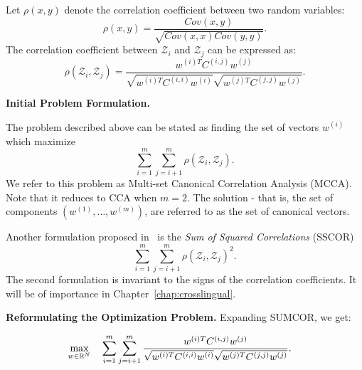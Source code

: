 Let $\rho\left(x,y\right)$ denote the correlation
 coefficient between two random variables:
\begin{equation*}
\rho\left(x,y\right) =
 \frac{Cov\left(x,y\right)}{\sqrt{Cov\left(x,x\right) Cov\left(y,y\right)}}.
\end{equation*}
 The correlation coefficient between $\mathcal{Z}_i$ and
 $\mathcal{Z}_j$ can be expressed as:
\begin{equation*}
\rho\left(\mathcal{Z}_i, \mathcal{Z}_j\right) = \frac{w^{(i)T} C^{(i,j)}
   w^{(j)}}{\sqrt{w^{(i)T} C^{(i,i)} w^{(i)}}\sqrt{w^{(j)T}
     C^{(j,j)} w^{(j)}} }.
\end{equation*}

\noindent\textbf{Initial Problem Formulation.}

The problem described above can be stated as
finding the set of vectors $w^{(i)}$
which maximize
\begin{equation}\label{eq:SUMCOR}
\tag{SUMCOR}
\sum_{i = 1}^m \sum_{j = i+1}^m
\rho\left(\mathcal{Z}_i, \mathcal{Z}_j\right).
\end{equation}
We refer to this problem as Multi-set Canonical
Correlation Analysis (MCCA). Note that it reduces to CCA when
$m=2$. The solution - that is, the set of components $\left(w^{(1)}, \ldots, w^{(m)}\right)$,
are referred to as the set of canonical vectors.

Another formulation proposed in~\cite{Kettenring} is the \emph{Sum of Squared Correlations} (SSCOR)
\begin{equation}\label{eq:SSCOR}
\tag{SSCOR}
\sum_{i = 1}^m \sum_{j = i+1}^m
\rho\left(\mathcal{Z}_i, \mathcal{Z}_j\right)^2.
\end{equation}
The second formulation is invariant to the signs of the correlation coefficients. It will
be of importance in Chapter~\ref{chap:crosslingual}.

\noindent\textbf{Reformulating the Optimization Problem.}
Expanding SUMCOR, we get:

\begin{equation*}
\begin{aligned}
& \underset{w \in \mathbb{R}^N}{\text{max}} & & \sum_{i = 1}^m
  \sum_{j = i+1}^m \frac{w^{(i)T} C^{(i,j)}
    w^{(j)}}{\sqrt{w^{(i)T} C^{(i,i)} w^{(i)}} \sqrt{w^{(j)T}
      C^{(j,j)} w^{(j)}}}.
\end{aligned}
\end{equation*}

